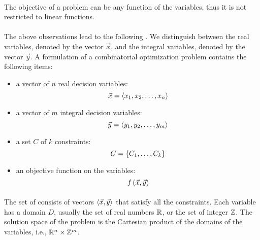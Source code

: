 \begin{definition}
\paragraph{}
The objective of a problem can be any function of the variables, thus it is not restricted to linear functions.

\paragraph{}
The above observations lead to the following . We distinguish between the real variables, denoted by the vector $\vec{x}$, and the integral variables, denoted by the
vector $\vec{y}$. A formulation of a combinatorial optimization problem contains the following items:
\begin{itemize}
 \item a vector of $n$ real decision variables:
 \begin{equation}
  \vec{x}=\left\langle x_1,x_2,\ldots,x_n \right\rangle
 \end{equation}
 \item a vector of $m$ integral decision variables:
 \begin{equation}
  \vec{y}=\left\langle y_1,y_2,\ldots,y_m \right\rangle
 \end{equation}
 \item a set $C$ of $k$ constraints:
 \begin{equation}
  C=\left\{ C_1,\ldots,C_k \right\}
 \end{equation}
 \item an objective function on the variables:
 \begin{equation}
  f\left( \vec{x},\vec{y} \right)
 \end{equation}
\end{itemize}

\paragraph{}
The set of  consists of vectors $\left\langle \vec{x},\vec{y} \right\rangle$ that satisfy all the constraints. Each variable has a domain $D$, usually the set of real numbers $\mathbb{R}$, or the set of integer $\mathbb{Z}$. The solution space of the problem is the Cartesian product of the domains of the variables, i.e., $\mathbb{R}^n\times\mathbb{Z}^m$.


\end{definition}
